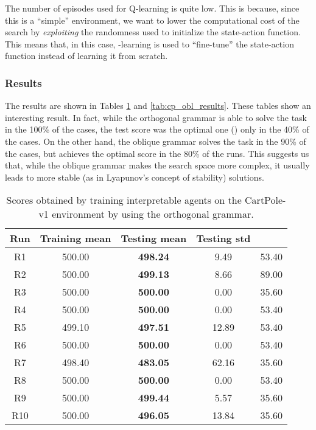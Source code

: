 \documentclass[review,english]{elsarticle}
\begin{document}
The number of episodes used for Q-learning is quite low.
This is because, since this is a ``simple'' environment, we want to lower the computational cost of the search by \textit{exploiting} the randomness used to initialize the state-action function.
This means that, in this case, -learning is used to ``fine-tune'' the state-action function instead of learning it from scratch.

\subsubsection{Results}
The results are shown in Tables \ref{tab:cp_ort_results} and \ref{tab:cp_obl_results}.
These tables show an interesting result.
In fact, while the orthogonal grammar is able to solve the task in the 100\% of the cases, the test score was the optimal one () only in the 40\% of the cases.
On the other hand, the oblique grammar solves the task in the 90\% of the cases, but achieves the optimal score in the 80\% of the runs.
This suggests us that, while the oblique grammar makes the search space more complex, it usually leads to more stable (as in Lyapunov's concept of stability) solutions.

\begin{table}[p]
\begin{center}
\begin{tabular}{|c|c|c|c|c|} \hline  \textbf{Run} & \textbf{Training mean} & \textbf{Testing mean} & \textbf{Testing std} & \\ \hline
 R1 & 500.00 & \textbf{498.24} & 9.49 & 53.40 \\ R2 & 500.00 & \textbf{499.13} & 8.66 & 89.00 \\ R3 & 500.00 & \textbf{500.00} & 0.00 & 35.60 \\ R4 & 500.00 & \textbf{500.00} & 0.00 & 53.40 \\ R5 & 499.10 & \textbf{497.51} & 12.89 & 53.40 \\ R6 & 500.00 & \textbf{500.00} & 0.00 & 53.40 \\ R7 & 498.40 & \textbf{483.05} & 62.16 & 35.60 \\ R8 & 500.00 & \textbf{500.00} & 0.00 & 53.40 \\ R9 & 500.00 & \textbf{499.44} & 5.57 & 35.60 \\ R10 & 500.00 & \textbf{496.05} & 13.84 & 35.60 \\ \hline
\end{tabular}
\end{center}
\caption{Scores obtained by training interpretable agents on the CartPole-v1 environment by using the orthogonal grammar.}
\label{tab:cp_ort_results}
\end{table}
\end{document}
